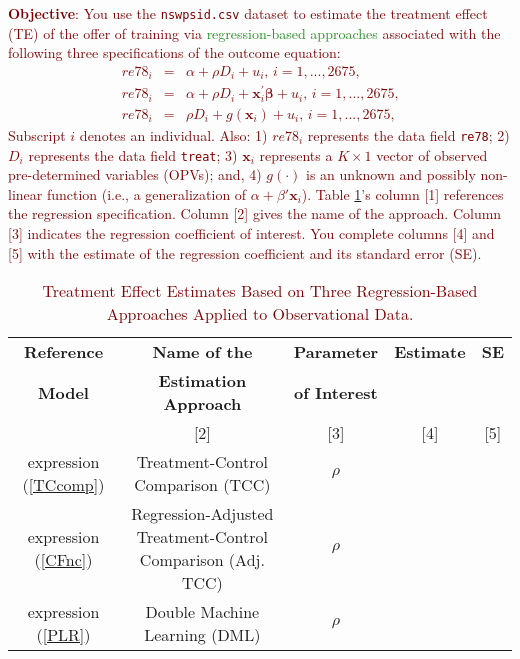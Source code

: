 \documentclass{article}
\begin{document}
\noindent \textcolor{Maroon}{\textbf{Objective}: You use the \texttt{nswpsid.csv} dataset to estimate the treatment effect (TE) of the offer of training via \textcolor{ForestGreen}{regression-based approaches} associated with the following three specifications of the outcome equation:
\begin{eqnarray}
re78_{i} &=&\alpha +\rho D_{i}+u_{i}\text{, }i=1,...,2675\text{,}
\label{TCcomp} \\
re78_{i} &=&\alpha +\rho D_{i}+\mathbf{x}_{i}^{\prime }\mathbf{\beta }+u_{i}\text{, }i=1,...,2675\text{,}  \label{CFnc} \\
re78_{i} &=&\rho D_{i}+g(\mathbf{x}_{i})+u_{i}\text{, }i=1,...,2675\text{,}  \label{PLR} 
\end{eqnarray}
\noindent Subscript $i$ denotes an individual.  Also: 1) $re78_{i}$ represents the data field \texttt{re78}; 2) $D_{i}$ represents the data field \texttt{treat}; 3) $\mathbf{x}_{i}$ represents a $K\times 1$ vector of observed pre-determined variables (OPVs); and, 4) $g(\cdot)$ is an unknown and possibly non-linear function (i.e., a generalization of $\alpha + \beta' \mathbf{x}_{i}$). Table \ref{tab:reg-specs}'s column [1] references the regression specification. Column [2] gives the name of the approach. Column [3] indicates the regression coefficient of interest. You complete columns [4] and [5] with the estimate of the regression coefficient and its standard error (SE).}

\begin{table}[ht!]
\centering
\colorbox{lightmaroon}{
{\color{Maroon}
\begin{tabular}{ccccc}
\hline
\textbf{Reference} & \multicolumn{1}{c}{\textbf{Name of the }} & \textbf{Parameter} & \multicolumn{1}{c}{\textbf{Estimate}} & \textbf{SE} \\
\textbf{Model} & \multicolumn{1}{c}{\textbf{Estimation Approach}}            & \textbf{of Interest} &  &  \\ \hline
[1] & [2] & [3] & [4] & [5]  \\ \hline
expression (\ref{TCcomp})                 & Treatment-Control Comparison (TCC)                    & $\rho$             &   &   \\
expression (\ref{CFnc})                 & Regression-Adjusted Treatment-Control Comparison (Adj. TCC) & $\rho$             &  &  \\
expression (\ref{PLR})                 & Double Machine Learning (DML) & $\rho$             &  &  \\
\hline
\end{tabular}}}
\caption{\textcolor{Maroon}{Treatment Effect Estimates Based on Three Regression-Based Approaches Applied to Observational Data.}}
\label{tab:reg-specs}
\end{table}
\end{document}
